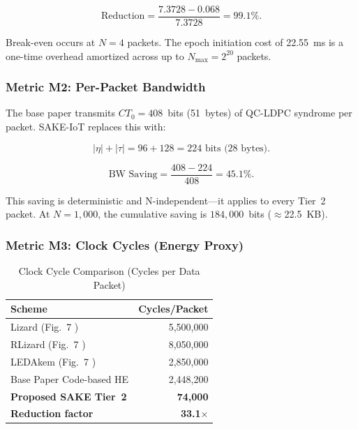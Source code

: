 \documentclass[conference]{IEEEtran}
\newcommand{\Nmax}{N_{\max}}
\begin{document}
\begin{equation}
\text{Reduction} = \frac{7.3728 - 0.068}{7.3728} = \mathbf{99.1\%}.
\label{eq:latency}
\end{equation}

Break-even occurs at $N{=}4$ packets. The epoch initiation cost
of 22.55~ms is a one-time overhead amortized across up to
$\Nmax = 2^{20}$ packets.

\subsubsection{Metric M2: Per-Packet Bandwidth}

The base paper transmits $CT_0 = 408$~bits (51~bytes) of QC-LDPC
syndrome per packet. SAKE-IoT replaces this with:

\begin{equation}
|\eta| + |\tau| = 96 + 128 = 224 \text{ bits (28 bytes)}.
\label{eq:bw}
\end{equation}

\begin{equation}
\text{BW Saving} = \frac{408 - 224}{408} = \mathbf{45.1\%}.
\label{eq:bwsave}
\end{equation}

This saving is deterministic and N-independent---it applies to every
Tier~2 packet. At $N{=}1{,}000$, the cumulative saving is
$184{,}000$~bits ($\approx$22.5~KB).

\subsubsection{Metric M3: Clock Cycles (Energy Proxy)}

\begin{table}[t]
\centering
\caption{Clock Cycle Comparison (Cycles per Data Packet)}
\label{tab:cycles}
\renewcommand{\arraystretch}{1.1}
\begin{tabular}{lr}
\toprule
\textbf{Scheme} & \textbf{Cycles/Packet} \\
\midrule
Lizard (Fig.~7 \cite{kumari2022}) & 5,500,000 \\
RLizard (Fig.~7 \cite{kumari2022}) & 8,050,000 \\
LEDAkem (Fig.~7 \cite{kumari2022}) & 2,850,000 \\
Base Paper Code-based HE \cite{kumari2022} & 2,448,200 \\
\textbf{Proposed SAKE Tier~2} & \textbf{74,000} \\
\midrule
\textbf{Reduction factor} & \textbf{33.1$\times$} \\
\bottomrule
\end{tabular}
\end{table}
\end{document}
